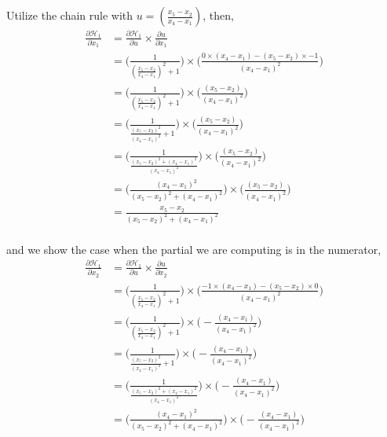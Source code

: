 \documentclass[paper=a4, fontsize=11pt]{scrartcl} %
\numberwithin{equation}{section} %
\numberwithin{figure}{section} %
\numberwithin{table}{section} %
\begin{document}
\begin{framed}
Utilize the chain rule with $u=(\frac{x_5 - x_2}{x_4 - x_1})$, then, 
\\
\begin{align*}
    \frac{\partial{\mathcal{H}_1}}{\partial{x_1}} &= \frac{\partial{\mathcal{H}_1}}{\partial{u}} \times \frac{\partial{u}}{\partial{x_1}} \\
    &= \bigg( \frac{1}{(\frac{x_5 - x_2}{x_4 - x_1})^2 + 1} \bigg) \times \bigg(  \frac{0 \times (x_4-x_1) - (x_5-x_2)\times -1 }{(x_4 - x_1)^2}  \bigg) \\
    &= \bigg( \frac{1}{(\frac{x_5 - x_2}{x_4 - x_1})^2 + 1} \bigg) \times \bigg(  \frac{(x_5-x_2)}{(x_4 - x_1)^2}  \bigg) \\
    &= \bigg( \frac{1}{\frac{(x_5 - x_2)^2}{(x_4 - x_1)^2} + 1} \bigg) \times \bigg(  \frac{(x_5-x_2)}{(x_4 - x_1)^2}  \bigg) \\
    &= \bigg( \frac{1}{\frac{(x_5 - x_2)^2 + (x_4-x_1)^2}{(x_4 - x_1)^2}} \bigg) \times \bigg(  \frac{(x_5-x_2)}{(x_4 - x_1)^2}  \bigg) \\
    &= \bigg( \frac{(x_4 - x_1)^2}{(x_5 - x_2)^2 + (x_4-x_1)^2} \bigg) \times \bigg(  \frac{(x_5-x_2)}{(x_4 - x_1)^2}  \bigg) \\
    &= \frac{x_5-x_2}{(x_5 - x_2)^2 + (x_4-x_1)^2}
\end{align*}
\\
and we show the case when the partial we are computing is in the numerator,
\\
\begin{align*}
    \frac{\partial{\mathcal{H}_1}}{\partial{x_2}} &= \frac{\partial{\mathcal{H}_1}}{\partial{u}} \times \frac{\partial{u}}{\partial{x_2}} \\
    &= \bigg( \frac{1}{(\frac{x_5 - x_2}{x_4 - x_1})^2 + 1} \bigg) \times \bigg(  \frac{-1 \times (x_4-x_1) - (x_5-x_2)\times 0 }{(x_4 - x_1)^2}  \bigg) \\
    &= \bigg( \frac{1}{(\frac{x_5 - x_2}{x_4 - x_1})^2 + 1} \bigg) \times \bigg(  -\frac{(x_4-x_1)}{(x_4 - x_1)^2}  \bigg) \\
    &= \bigg( \frac{1}{\frac{(x_5 - x_2)^2}{(x_4 - x_1)^2} + 1} \bigg) \times \bigg(  -\frac{(x_4-x_1)}{(x_4 - x_1)^2}  \bigg) \\
    &= \bigg( \frac{1}{\frac{(x_5 - x_2)^2 + (x_4-x_1)^2}{(x_4 - x_1)^2}} \bigg) \times \bigg(  -\frac{(x_4-x_1)}{(x_4 - x_1)^2}  \bigg) \\
    &= \bigg( \frac{(x_4 - x_1)^2}{(x_5 - x_2)^2 + (x_4-x_1)^2} \bigg) \times \bigg(  -\frac{(x_4-x_1)}{(x_4 - x_1)^2}  \bigg) \\

\end{align*}
\end{framed}
\end{document}
